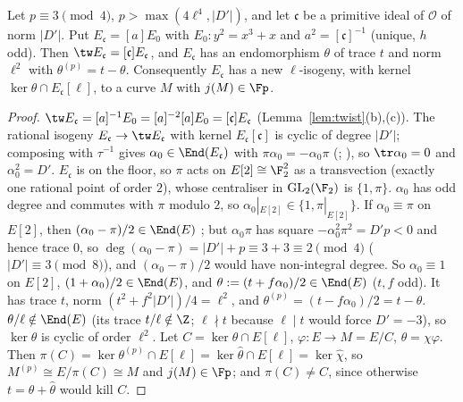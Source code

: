 \begin{lemma}\label{lem:oddconv}
Let $p\equiv3\pmod4$, $p>\max(4\ell^4,|D'|)$, and let $\mathfrak c$ be a primitive ideal of $\mathcal O$ of norm $|D'|$.  Put
$E_{\mathfrak c}=[a]E_0$ with $E_0:y^2=x^3+x$ and $a^2=[\mathfrak c]^{-1}$ (unique, $h$ odd).  Then $\tw E_{\mathfrak c}=[\mathfrak c]E_{\mathfrak c}$,
and $E_{\mathfrak c}$ has an endomorphism $\theta$ of trace $t$ and norm $\ell^2$ with $\theta^{(p)}=t-\theta$.  Consequently
$E_{\mathfrak c}$ has a new $\ell$-isogeny, with kernel $\ker\theta\cap E_{\mathfrak c}[\ell]$, to a curve $M$ with $j(M)\in\Fp$.
\end{lemma}
\begin{proof}
$\tw E_{\mathfrak c}=[a]^{-1}E_0=[a]^{-2}[a]E_0=[\mathfrak c]E_{\mathfrak c}$ (Lemma~\ref{lem:twist}(b),(c)).  The rational isogeny
$E_{\mathfrak c}\to\tw E_{\mathfrak c}$ with kernel $E_{\mathfrak c}[\mathfrak c]$ is cyclic of degree $|D'|$; composing with $\tau^{-1}$
gives $\alpha_0\in\End(E_{\mathfrak c})$ with $\pi\alpha_0=-\alpha_0\pi$ (\cite[Lemma~13]{CPV}; \cite[Thm.~3.10]{AMPV}), so
$\tr\alpha_0=0$ and $\alpha_0^2=D'$.  $E_{\mathfrak c}$ is on the floor, so $\pi$ acts on $E[2]\cong\F_2^2$ as a transvection
(exactly one rational point of order $2$), whose centraliser in $\mathrm{GL}_2(\F_2)$ is $\{1,\pi\}$.  $\alpha_0$ has odd degree and
commutes with $\pi$ modulo $2$, so $\alpha_0|_{E[2]}\in\{1,\pi|_{E[2]}\}$.  If $\alpha_0\equiv\pi$ on $E[2]$, then
$(\alpha_0-\pi)/2\in\End(E)$ \cite[Cor.~III.4.11]{Silverman}; but $\alpha_0\pi$ has square $-\alpha_0^2\pi^2=D'p<0$ and hence trace $0$,
so $\deg(\alpha_0-\pi)=|D'|+p\equiv3+3\equiv2\pmod 4$ ($|D'|\equiv3\pmod8$), and $(\alpha_0-\pi)/2$ would have non-integral
degree.  So $\alpha_0\equiv1$ on $E[2]$, $(1+\alpha_0)/2\in\End(E)$, and $\theta:=(t+f\alpha_0)/2\in\End(E)$ ($t,f$ odd).  It has
trace $t$, norm $(t^2+f^2|D'|)/4=\ell^2$, and $\theta^{(p)}=(t-f\alpha_0)/2=t-\theta$.
$\theta/\ell\notin\End(E)$ (its trace $t/\ell\notin\Z$; $\ell\nmid t$ because $\ell\mid t$ would force $D'=-3$), so $\ker\theta$ is cyclic of
order $\ell^2$.  Let $C=\ker\theta\cap E[\ell]$, $\varphi:E\to M=E/C$, $\theta=\chi\varphi$.  Then $\pi(C)=\ker\theta^{(p)}\cap
E[\ell]=\ker\widehat\theta\cap E[\ell]=\ker\widehat\chi$, so $M^{(p)}\cong E/\pi(C)\cong M$ and $j(M)\in\Fp$; and $\pi(C)\neq C$,
since otherwise $t=\theta+\widehat\theta$ would kill $C$.
\end{proof}

